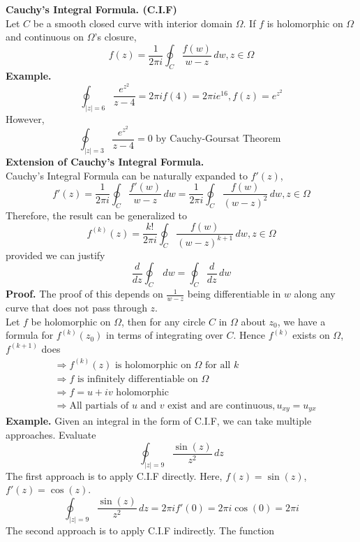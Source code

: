 \documentclass[11pt]{article}
\begin{document}
\textbf{Cauchy's Integral Formula. (C.I.F)} \\
Let $C$ be a smooth closed curve with interior domain $\Omega$. If $f$ is holomorphic on $\Omega$ and continuous on $\Omega$'s closure, 
$$f(z) = \frac{1}{2\pi i}\oint_C \frac{f(w)}{w - z} \, dw, z \in \Omega$$
\newline 
\textbf{Example.}
$$ \oint_{|z| = 6} \frac{e^{z^2}}{z - 4} = 2\pi if(4) = 2\pi i e^{16}, f(z) = e^{z^2}$$
However, 
\begin{equation*}
\oint_{|z| = 3} \frac{e^{z^2}}{z - 4} = 0 \mbox{ by Cauchy-Goursat Theorem }
\end{equation*}
\newline 
\newline
\textbf{Extension of Cauchy's Integral Formula.} \\
Cauchy's Integral Formula can be naturally expanded to $f'(z)$, 
$$ f'(z) = \frac{1}{2\pi i}\oint_C \frac{f'(w)}{w - z} \, dw = \frac{1}{2\pi i}\oint_C \frac{f(w)}{(w - z)^2} \, dw, z \in \Omega$$
Therefore, the result can be generalized to 
$$f^{(k)}(z) = \frac{k!}{2\pi i}\oint_C \frac{f(w)}{(w - z)^{k + 1}} \, dw, z \in \Omega$$
provided we can justify 
$$\frac{d}{dz} \oint_C \,dw = \oint_C \frac{d}{dz} \, dw$$
\textbf{Proof.} The proof of this depends on $\frac{1}{w - z}$ being differentiable in $w$ along any curve that does not pass through $z$. \\
Let $f$ be holomorphic on $\Omega$, then for any circle $C$ in $\Omega$ about $z_0$, we have a formula for $f^{(k)}(z_0)$ in terms of integrating over $C$. Hence $f^{(k)}$ exists on $\Omega$, $f^{(k + 1)}$ does 
\begin{align*}
&\Rightarrow f^{(k)}(z) \mbox{ is holomorphic on } \Omega \mbox{ for all } k \\ 
&\Rightarrow f \mbox{ is infinitely differentiable on } \Omega \\ 
&\Rightarrow f = u + iv \mbox{ holomorphic } \\
&\Rightarrow \mbox{All partials of } u \mbox{ and } v \mbox{ exist and are continuous}, u_{xy} = u_{yx} 
\end{align*}
\newline
\textbf{Example.} Given an integral in the form of C.I.F, we can take multiple approaches. Evaluate 
$$\oint_{|z| = 9} \frac{\sin(z)}{z^2} \,dz$$
The first approach is to apply C.I.F directly. Here, $f(z) = \sin(z)$, $f'(z) = \cos(z)$. 
$$ \oint_{|z| = 9} \frac{\sin(z)}{z^2} \,dz = 2\pi i f'(0) = 2\pi i \cos(0) = 2\pi i$$
The second approach is to apply C.I.F indirectly. The function
\end{document}
